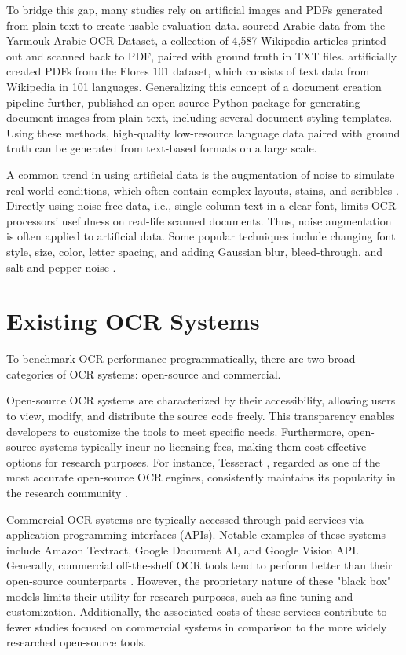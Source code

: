 \documentclass[12pt,oneside]{memoir}
\begin{document}
To bridge this gap, many studies rely on artificial images and PDFs generated from plain text to create usable evaluation data.
\textcite{hegghammer-2022} sourced Arabic data from the Yarmouk Arabic OCR Dataset, a collection of 4,587 Wikipedia articles printed out and scanned back to PDF, paired with ground truth in TXT files.
\textcite{ignat-etal-2022} artificially created PDFs from the Flores 101 dataset, which consists of text data from Wikipedia in 101 languages.
Generalizing this concept of a document creation pipeline further, \textcite{gupte-etal-2021} published an open-source Python package for generating document images from plain text, including several document styling templates.
Using these methods, high-quality low-resource language data paired with ground truth can be generated from text-based formats on a large scale.

A common trend in using artificial data is the augmentation of noise to simulate real-world conditions, which often contain complex layouts, stains, and scribbles \parencite{hegghammer-2022}.
Directly using noise-free data, i.e., single-column text in a clear font, limits OCR processors' usefulness on real-life scanned documents.
Thus, noise augmentation is often applied to artificial data.
Some popular techniques include changing font style, size, color, letter spacing, and adding Gaussian blur, bleed-through, and salt-and-pepper noise \parencite{gupte-etal-2021, ignat-etal-2022}.

\section{Existing OCR Systems}
To benchmark OCR performance programmatically, there are two broad categories of OCR systems: open-source and commercial.

Open-source OCR systems are characterized by their accessibility, allowing users to view, modify, and distribute the source code freely.
This transparency enables developers to customize the tools to meet specific needs.
Furthermore, open-source systems typically incur no licensing fees, making them cost-effective options for research purposes.
For instance, Tesseract \parencite{smith-2013}, regarded as one of the most accurate open-source OCR engines, consistently maintains its popularity in the research community \parencite{hegghammer-2022, ignat-etal-2022}.

Commercial OCR systems are typically accessed through paid services via application programming interfaces (APIs).
Notable examples of these systems include Amazon Textract, Google Document AI, and Google Vision API.
Generally, commercial off-the-shelf OCR tools tend to perform better than their open-source counterparts \parencite{hegghammer-2022, ignat-etal-2022}.
However, the proprietary nature of these "black box" models limits their utility for research purposes, such as fine-tuning and customization.
Additionally, the associated costs of these services contribute to fewer studies focused on commercial systems in comparison to the more widely researched open-source tools.
\end{document}
